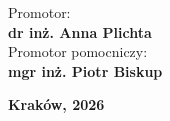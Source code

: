 \vspace{1.5cm}

\hfill
\begin{minipage}{0.55\textwidth}
    \raggedleft
    Promotor:\\
    \textbf{dr inż. Anna Plichta}\\[2mm]
    Promotor pomocniczy:\\
    \textbf{mgr inż. Piotr Biskup}
\end{minipage}

\vfill

\begin{center}
    {\bfseries Kraków, 2026}
\end{center}

\clearpage
\restoregeometry